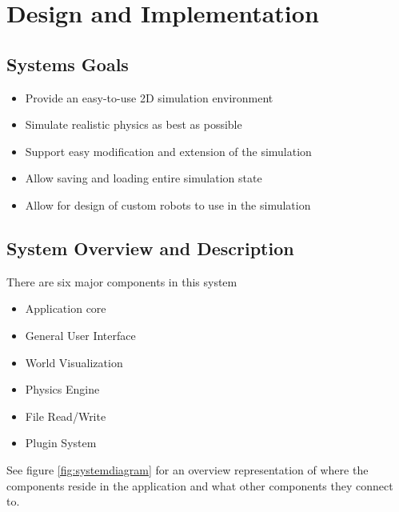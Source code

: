 

\chapter{Design  and Implementation}

\section{Systems Goals}
\begin{itemize}
	\item Provide an easy-to-use 2D simulation environment
	\item Simulate realistic physics as best as possible
	\item Support easy modification and extension of the simulation
	\item Allow saving and loading entire simulation state
	\item Allow for design of custom robots to use in the simulation
\end{itemize}

\section{System Overview and Description}
There are six major components in this system
\begin{itemize}
	\item Application core
	\item General User Interface
	\item World Visualization
	\item Physics Engine
	\item File Read/Write
	\item Plugin System
\end{itemize}
See figure \ref{fig:systemdiagram} for an overview representation of where the components reside in the application and what other components they connect to.

